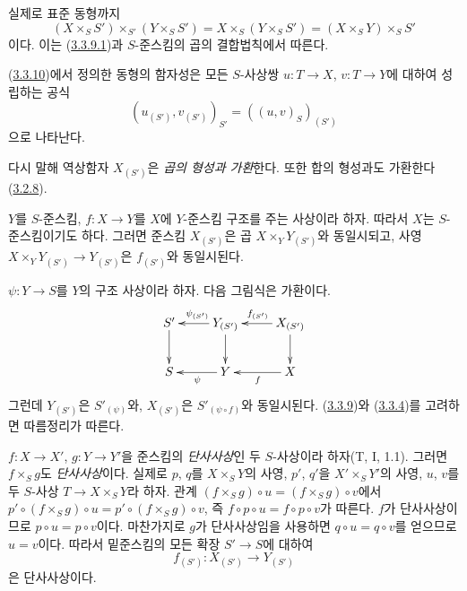 실제로 표준 동형까지
\[
  (X\times_S S')\times_{S'}(Y\times_S S')
  =X\times_S(Y\times_S S')=(X\times_S Y)\times_S S'
\]
이다. 이는 (\hyperref[I.3.3.9.1-ko]{3.3.9.1})과 $S$-준스킴의
곱의 결합법칙에서 따른다.

(\hyperref[I.3.3.10-ko]{3.3.10})에서 정의한 동형의 함자성은 모든
$S$-사상쌍 $u:T\to X$, $v:T\to Y$에 대하여 성립하는 공식
\begin{equation}
  (u_{(S')},v_{(S')})_{S'}=((u,v)_S)_{(S')}
  \tag{3.3.10.1}\label{I.3.3.10.1-ko}
\end{equation}
으로 나타난다.

다시 말해 역상함자 $X_{(S')}$은 \emph{곱의 형성과 가환}한다.
또한 합의 형성과도 가환한다(\hyperref[I.3.2.8-ko]{3.2.8}).

\begin{corollary}[3.3.11]
\label{I.3.3.11-ko}
$Y$를 $S$-준스킴, $f:X\to Y$를 $X$에 $Y$-준스킴 구조를 주는
사상이라 하자. 따라서 $X$는 $S$-준스킴이기도 하다. 그러면 준스킴
$X_{(S')}$은 곱 $X\times_Y Y_{(S')}$와 동일시되고, 사영
$X\times_Y Y_{(S')}\to Y_{(S')}$은 $f_{(S')}$와 동일시된다.
\end{corollary}

$\psi:Y\to S$를 $Y$의 구조 사상이라 하자. 다음 그림식은
가환이다.
\label{I.3.3.11.diagram-ko}
\[
  \xymatrix{
    S'\ar[d] &
    Y_{(S')}\ar[l]_{\psi_{(S')}}\ar[d] &
    X_{(S')}\ar[l]_{f_{(S')}}\ar[d]\\
    S & Y\ar[l]^{\psi} & X\ar[l]^{f}
  }
\]
그런데 $Y_{(S')}$은 $S'_{(\psi)}$와, $X_{(S')}$은
$S'_{(\psi\circ f)}$와 동일시된다.
(\hyperref[I.3.3.9-ko]{3.3.9})와
(\hyperref[I.3.3.4-ko]{3.3.4})를 고려하면 따름정리가 따른다.

\begin{env}[3.3.12]
\label{I.3.3.12-ko}
$f:X\to X'$, $g:Y\to Y'$을 준스킴의 \emph{단사사상}인 두
$S$-사상이라 하자(T, I, 1.1). 그러면 $f\times_S g$도
\emph{단사사상}이다. 실제로 $p$, $q$를 $X\times_S Y$의 사영,
$p'$, $q'$을 $X'\times_S Y'$의 사영, $u$, $v$를 두
$S$-사상 $T\to X\times_S Y$라 하자. 관계
$(f\times_S g)\circ u=(f\times_S g)\circ v$에서
$p'\circ(f\times_S g)\circ u=p'\circ(f\times_S g)\circ v$, 즉
$f\circ p\circ u=f\circ p\circ v$가 따른다. $f$가
단사사상이므로 $p\circ u=p\circ v$이다. 마찬가지로 $g$가
단사사상임을 사용하면 $q\circ u=q\circ v$를 얻으므로 $u=v$이다.
따라서 밑준스킴의 모든 확장 $S'\to S$에 대하여
\label{I.3.3.12.base-change-monomorphism-ko}
\[
  f_{(S')}:X_{(S')}\to Y_{(S')}
\]
은 단사사상이다.
\end{env}

